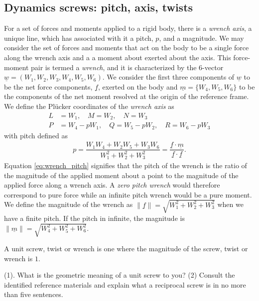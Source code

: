 \subsection{Dynamics screws: pitch, axis, twists}
%
For a set of forces and moments applied to a rigid body, there is a \textit{wrench axis}, a unique line, which has associated with it a pitch, $p$, and a magnitude. We may consider the set of forces and moments that act on the body to be a single force along  the wrench axis and a a moment about exerted about the axis. This force-moment pair is termed a \textit{wrench}, and it is characterized by the 6-vector $\underline{w} = (W_1, W_2, W_3, W_4, W_5, W_6)$. We consider the first three components of $\underline{w}$ to be the net force components, $\underline{f}$, exerted on the body and $\underline{m}=\{W_4, W_5, W_6\}$ to be the components of the net moment resolved at the origin of the reference frame. We define the Pl\"ucker coordinates of the \textit{wrench axis} as 
%
\begin{subequations}
	\begin{align}
	L &= W_1, \quad M=W_2, \quad N = W_3 \\
	P&= W_4-pW_1, \quad Q = W_5 - pW_2, \quad R=W_6 - pW_3
	\end{align}
\end{subequations}
%
with pitch defined as
%
\begin{align}
	p = \dfrac{W_1 W_4 + W_2 W_5 + W_3 W_6}{W_1^2 + W_2^2+W_3^2} = \dfrac{\underline{f} \cdot \underline{m}}{\underline{f} \cdot \underline{f}}.
	\label{eq:wrench_pitch}
\end{align}
%
Equation \eqref{eq:wrench_pitch} signifies that the pitch of the wrench is the ratio of the magnitude of the applied moment about a point to the magnitude of the applied force along a wrench axis. A \textit{zero pitch wrench}  would therefore correspond to pure force while an infinite pitch wrench would be a pure moment. We define the magnitude of the wrench as $\|\underline{f}\| = \sqrt{W_1^2 + W_2^2 + W_3^2}$ when we have a finite pitch. If the pitch in infinite, the magnitude is $\|\underline{m}\| = \sqrt{W_4^2 + W_5^2 + W_6^2}$.

\noindent 
\begin{homework}
	A unit screw, twist or wrench is one where the magnitude of the screw, twist or wrench is $1$.  
	
	(1). What is the geometric meaning of a unit screw to you? %
	(2) Consult the identified reference materials and explain what a reciprocal screw is in no more than five sentences.
\end{homework}



